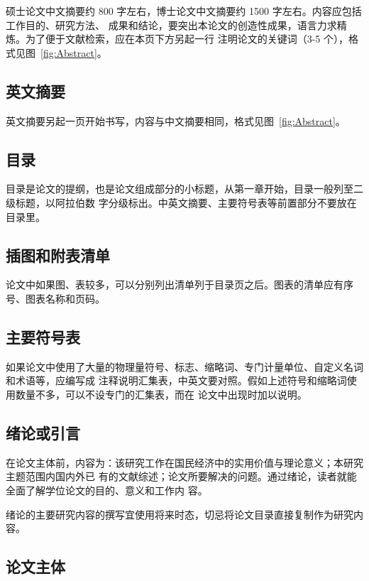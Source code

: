 硕士论文中文摘要约 800 字左右，博士论文中文摘要约 1500 字左右。内容应包括工作目的、研究方法、
成果和结论，要突出本论文的创造性成果，语言力求精炼。为了便于文献检索，应在本页下方另起一行
注明论文的关键词（3-5 个），格式见图~\ref{fig:Abstract}。

\subsection{英文摘要}
\label{sec:abstract-en}

英文摘要另起一页开始书写，内容与中文摘要相同，格式见图~\ref{fig:Abstract}。

\subsection{目录}
\label{sec:toc}

目录是论文的提纲，也是论文组成部分的小标题，从第一章开始，目录一般列至二级标题，以阿拉伯数
字分级标出。中英文摘要、主要符号表等前置部分不要放在目录里。

\subsection{插图和附表清单}
\label{sec:lof}

论文中如果图、表较多，可以分别列出清单列于目录页之后。图表的清单应有序号、图表名称和页码。

\subsection{主要符号表}
\label{sec:los}

如果论文中使用了大量的物理量符号、标志、缩略词、专门计量单位、自定义名词和术语等，应编写成
注释说明汇集表，中英文要对照。假如上述符号和缩略词使用数量不多，可以不设专门的汇集表，而在
论文中出现时加以说明。

\subsection{绪论或引言}
\label{sec:preface}

在论文主体前，内容为：该研究工作在国民经济中的实用价值与理论意义；本研究主题范围内国内外已
有的文献综述；论文所要解决的问题。通过绪论，读者就能全面了解学位论文的目的、意义和工作内
容。

绪论的主要研究内容的撰写宜使用将来时态，切忌将论文目录直接复制作为研究内容。

\subsection{论文主体}
\label{sec:body}

